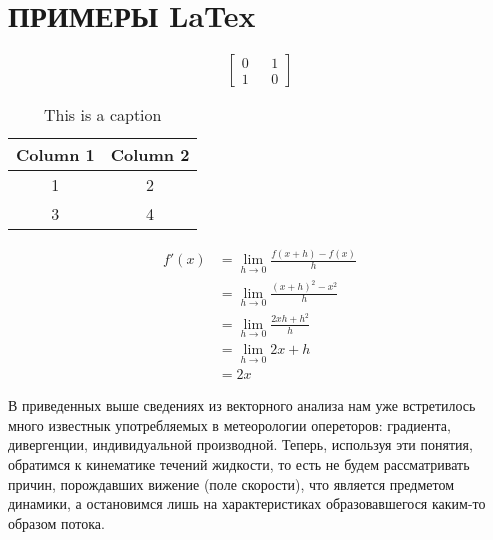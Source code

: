 \chapter*{ПРИМЕРЫ LaTex}

{\color{red}
    \[ \begin{bmatrix}
        0 && 1\\
        1 && 0
    \end{bmatrix}\]

\begin{table}[h]
    \centering
    \begin{tabular}{|c|c|} \hline 
         Column 1& Column 2\\ \hline \hline 
         1& 2\\ \hline 
         3& 4\\ \hline
    \end{tabular}
    \caption{This is a caption}
    \label{tab:my_label}
\end{table}

     \begin{align*}
         f'(x)&=\lim_{h\to 0}\frac{f(x+h)-f(x)}{h}\\
         &= \lim_{h\to 0}\frac{(x+h)^2-x^2}{h}\\
         &= \lim_{h\to 0}\frac{2xh+h^2}{h}\\
         &= \lim_{h\to 0}2x+h\\
         &=2x
     \end{align*}


}

\begin{boxA}
В приведенных выше сведениях из векторного анализа нам уже встретилось много известнык употребляемых в метеорологии  опереторов: градиента, дивергенции, индивидуальной производной. Теперь, используя эти понятия, обратимся к кинематике течений жидкости, то есть не будем рассматривать причин, порождавших вижение (поле скорости), что является предметом динамики, а остановимся лишь на характеристиках образовавшегося каким-то образом потока.
\end{boxA}

